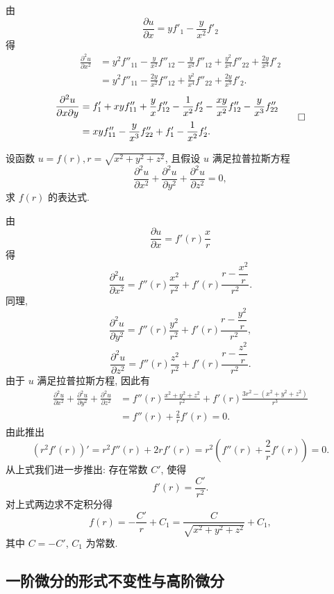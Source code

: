 \begin{solve}
由
\[
  \frac{\partial u}{\partial x}=yf'_1-\frac y{x^2}f'_2
\]
得
\[
\begin{aligned}
  \frac{\partial^2u}{\partial x^2}
  &=y^2f''_{11}-\frac y{x^2}f''_{12}
  -\frac y{x^2}f''_{12}+\frac{y^2}{x^4}f''_{22}
  +\frac{2y}{x^3}f'_2\\
  &=y^2f''_{11}-\frac{2y}{x^2}f''_{12}
  +\frac{y^2}{x^4}f''_{22}+\frac{2y}{x^3}f'_2.
\end{aligned}
\]
\[
\begin{aligned}
  \frac{\partial^2u}{\partial x\partial y}
  &=f'_1+xyf''_{11}+\frac yx f''_{12}
  -\frac1{x^2}f'_2-\frac{xy}{x^2}f''_{12}
  -\frac y{x^3}f''_{22}\\
  &=xyf''_{11}-\frac y{x^3}f''_{22}+f'_1-\frac1{x^2}f'_2.
\end{aligned}
\qedhere
\]
\end{solve}


\begin{example}\label{example:ma-14-2-9}
设函数 $u=f(r),r=\sqrt{x^2+y^2+z^2}$, 且假设 $u$ 满足拉普拉斯方程
\[
  \frac{\partial^2u}{\partial x^2}
  +\frac{\partial^2u}{\partial y^2}
  +\frac{\partial^2u}{\partial z^2}=0,
\]
求 $f(r)$ 的表达式.
\end{example}


\begin{solve}
由
\[
  \frac{\partial u}{\partial x}=f'(r)\frac xr
\]
得
\[
  \frac{\partial^2u}{\partial x^2}
  =f''(r)\frac{x^2}{r^2}+f'(r)\frac{r-\dfrac{x^2}{r}}{r^2}.
\]
同理,
\[
  \frac{\partial^2u}{\partial y^2}
  =f''(r)\frac{y^2}{r^2}+f'(r)\frac{r-\dfrac{y^2}{r}}{r^2},
\]
\[
  \frac{\partial^2u}{\partial z^2}
  =f''(r)\frac{z^2}{r^2}+f'(r)\frac{r-\dfrac{z^2}{r}}{r^2}.
\]
由于 $u$ 满足拉普拉斯方程, 因此有
\[
\begin{aligned}
  \frac{\partial^2u}{\partial x^2}
  +\frac{\partial^2u}{\partial y^2}
  +\frac{\partial^2u}{\partial z^2}
  &=f''(r)\frac{x^2+y^2+z^2}{r^2}
  +f'(r)\frac{3r^2-(x^2+y^2+z^2)}{r^3}\\
  &=f''(r)+\frac2r f'(r)=0.
\end{aligned}
\]
由此推出
\[
  (r^2f'(r))'=r^2f''(r)+2rf'(r)
  =r^2\left(f''(r)+\frac2r f'(r)\right)=0.
\]
从上式我们进一步推出: 存在常数 $C'$, 使得
\[
  f'(r)=\frac{C'}{r^2}.
\]
对上式两边求不定积分得
\[
  f(r)=-\frac{C'}r+C_1=\frac C{\sqrt{x^2+y^2+z^2}}+C_1,
\]
其中 $C=-C'$, $C_1$ 为常数.
\end{solve}


\subsection{一阶微分的形式不变性与高阶微分}
\label{subsec:ma-14-2-5}

